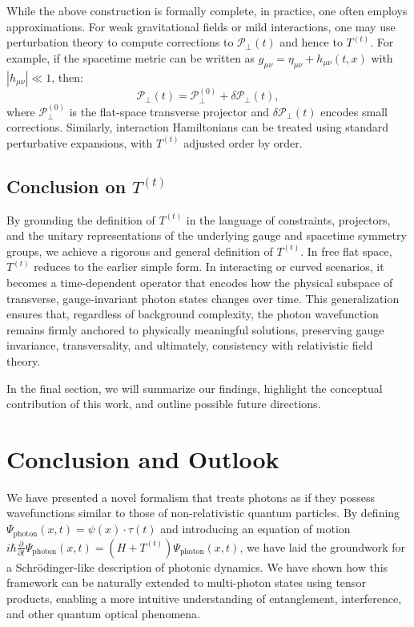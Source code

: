 \documentclass[aps,prl,twocolumn,showpacs,showkeys,superscriptaddress,amsmath,amssymb]{revtex4-2}
\begin{document}
While the above construction is formally complete, in practice, one often employs approximations. For weak gravitational fields or mild interactions, one may use perturbation theory to compute corrections to $\mathcal{P}_\perp(t)$ and hence to $T^{(t)}$. For example, if the spacetime metric can be written as $g_{\mu\nu} = \eta_{\mu\nu} + h_{\mu\nu}(t,x)$ with $|h_{\mu\nu}|\ll 1$, then:
\begin{equation}
\mathcal{P}_\perp(t) = \mathcal{P}_\perp^{(0)} + \delta\mathcal{P}_\perp(t),
\end{equation}
where $\mathcal{P}_\perp^{(0)}$ is the flat-space transverse projector and $\delta\mathcal{P}_\perp(t)$ encodes small corrections. Similarly, interaction Hamiltonians can be treated using standard perturbative expansions, with $T^{(t)}$ adjusted order by order.

\subsection{Conclusion on \texorpdfstring{$T^{(t)}$}{T(t)}}

By grounding the definition of $T^{(t)}$ in the language of constraints, projectors, and the unitary representations of the underlying gauge and spacetime symmetry groups, we achieve a rigorous and general definition of $T^{(t)}$. In free flat space, $T^{(t)}$ reduces to the earlier simple form. In interacting or curved scenarios, it becomes a time-dependent operator that encodes how the physical subspace of transverse, gauge-invariant photon states changes over time. This generalization ensures that, regardless of background complexity, the photon wavefunction remains firmly anchored to physically meaningful solutions, preserving gauge invariance, transversality, and ultimately, consistency with relativistic field theory.

In the final section, we will summarize our findings, highlight the conceptual contribution of this work, and outline possible future directions.


\section{Conclusion and Outlook}
\label{sec:conclusion}

We have presented a novel formalism that treats photons as if they possess wavefunctions similar to those of non-relativistic quantum particles. By defining $\Psi_{\text{photon}}(x,t) = \psi(x)\cdot\tau(t)$ and introducing an equation of motion $i\hbar \frac{\partial}{\partial t}\Psi_{\text{photon}}(x,t) = (H + T^{(t)})\Psi_{\text{photon}}(x,t)$, we have laid the groundwork for a Schr\"odinger-like description of photonic dynamics. We have shown how this framework can be naturally extended to multi-photon states using tensor products, enabling a more intuitive understanding of entanglement, interference, and other quantum optical phenomena.
\end{document}
